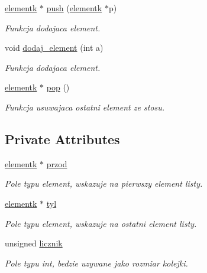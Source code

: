 \begin{DoxyCompactItemize}
\hyperlink{classelementk}{elementk} $\ast$ \hyperlink{classkolejka__lista_abb6cd9a2a527bcaa2515e62c9c6e6813}{push} (\hyperlink{classelementk}{elementk} $\ast$p)
\begin{DoxyCompactList}\small\item\em Funkcja dodajaca element. \end{DoxyCompactList}\item 
void \hyperlink{classkolejka__lista_af92f6af53ded24a2b86c85790797b356}{dodaj\-\_\-element} (int a)
\begin{DoxyCompactList}\small\item\em Funkcja dodajaca element. \end{DoxyCompactList}\item 
\hyperlink{classelementk}{elementk} $\ast$ \hyperlink{classkolejka__lista_a36a5b9c7c4e57e23aa8d2bb9afb223ef}{pop} ()
\begin{DoxyCompactList}\small\item\em Funkcja usuwajaca ostatni element ze stosu. \end{DoxyCompactList}\end{DoxyCompactItemize}
\subsection*{Private Attributes}
\begin{DoxyCompactItemize}
\item 
\hyperlink{classelementk}{elementk} $\ast$ \hyperlink{classkolejka__lista_aedc7846eba7725b49c3de16fa18ae33a}{przod}
\begin{DoxyCompactList}\small\item\em Pole typu element, wskazuje na pierwszy element listy. \end{DoxyCompactList}\item 
\hyperlink{classelementk}{elementk} $\ast$ \hyperlink{classkolejka__lista_a9675dc97e4a026b1556699024e24636e}{tyl}
\begin{DoxyCompactList}\small\item\em Pole typu element, wskazuje na ostatni element listy. \end{DoxyCompactList}\item 
unsigned \hyperlink{classkolejka__lista_a6b12b09e2f057761ac4d5ac1b1c82115}{licznik}
\begin{DoxyCompactList}\small\item\em Pole typu int, bedzie uzywane jako rozmiar kolejki. \end{DoxyCompactList}\end{DoxyCompactItemize}


